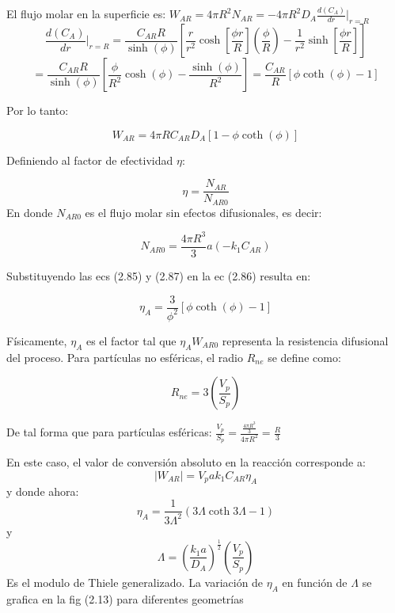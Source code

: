 El flujo molar en la superficie es: $W_{AR}=4\pi R^2N_{AR}=-4\pi R^2D_A\frac{d(C_A)}{dr}|_{r=R}$
\begin{equation*}
    \frac{d(C_A)}{dr}|_{r=R}=\frac{C_{AR}R}{\sinh (\phi)}[\frac{r}{r^2}\cosh[\frac{\phi r}{R}](\frac{\phi}{R})-\frac{1}{r^2}\sinh [\frac{\phi r}{R}]]
\end{equation*}
\begin{equation*}
    =\frac{C_{AR}R}{\sinh (\phi)}[\frac{\phi}{R^2}\cosh (\phi)-\frac{\sinh (\phi)}{R^2}]=\frac{C_{AR}}{R}[\phi \coth (\phi)-1]
\end{equation*}

Por lo tanto:

\begin{equation}
    W_{AR}=4\pi RC_{AR}D_A[1-\phi \coth (\phi)]
\end{equation}

Definiendo al factor de efectividad $\eta$:

\begin{equation}
    \eta=\frac{N_{AR}}{N_{AR0}}
\end{equation}
En donde $N_{AR0}$ es el flujo molar sin efectos difusionales, es decir:

\begin{equation}
    N_{AR0}=\frac{4\pi R^3}{3}a(-k_1C_{AR})
\end{equation}

Substituyendo las ecs (2.85) y (2.87) en la ec (2.86) resulta en: 

\begin{equation}
    \eta_A=\frac{3}{\phi^2}[\phi \coth (\phi)-1]
\end{equation}

Físicamente, $\eta_A$ es el factor tal que $\eta_AW_{AR0}$ representa la resistencia difusional del proceso. Para partículas no esféricas, el radio $R_{n e}$ se define como:

\begin{equation}
    R_{ne}=3(\frac{V_p}{S_p})
\end{equation}

De tal forma que para partículas esféricas: $\frac{V_p}{S_p}=\frac{\frac{4\pi R^3}{3}}{4\pi R^2}=\frac{R}{3}$

En este caso, el valor de conversión absoluto en la reacción corresponde a:
\begin{equation*}
    |W_{AR}|=V_pak_1C_{AR}\eta_A
\end{equation*}
y donde ahora:
\begin{equation}
    \eta_A=\frac{1}{3\Lambda^2}(3\Lambda \coth 3\Lambda-1)
\end{equation} 
y
\begin{equation}
    \Lambda=(\frac{k_1a}{D_A})^{\frac{1}{2}}(\frac{V_p}{S_p})
\end{equation}
Es el modulo de Thiele generalizado. La variación de $\eta_A$ en función de $\Lambda$ se grafica en la fig (2.13) para diferentes geometrías

